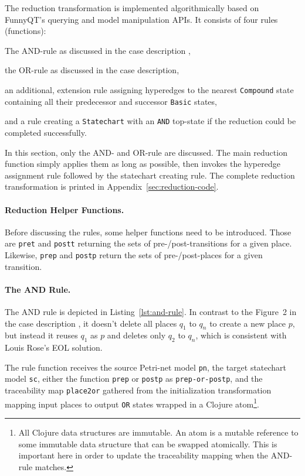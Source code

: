\documentclass[submission]{eptcs}
\begin{document}
The reduction transformation is implemented algorithmically based on FunnyQT's
querying and model manipulation APIs.  It consists of four rules (functions):
\begin{compactenum}
\item The AND-rule as discussed in the case description \cite{pn2sccasedesc},
\item the OR-rule as discussed in the case description,
\item an additional, extension rule assigning hyperedges to the nearest
  \verb|Compound| state containing all their predecessor and successor
  \verb|Basic| states,
\item and a rule creating a \verb|Statechart| with an \verb|AND| top-state if
  the reduction could be completed successfully.
\end{compactenum}

In this section, only the AND- and OR-rule are discussed.  The main reduction
function simply applies them as long as possible, then invokes the hyperedge
assignment rule followed by the statechart creating rule.  The complete
reduction transformation is printed in Appendix~\ref{sec:reduction-code}.

\paragraph{Reduction Helper Functions.}
\label{sec:reduct-help-functions}

Before discussing the rules, some helper functions need to be introduced.
Those are \verb|pret| and \verb|postt| returning the sets of
pre-/post-transitions for a given place.  Likewise, \verb|prep| and
\verb|postp| return the sets of pre-/post-places for a given transition.

\paragraph{The AND Rule.}
\label{sec:and-rule}

The AND rule is depicted in Listing~\ref{lst:and-rule}.  In contrast to the
Figure~2 in the case description \cite{pn2sccasedesc}, it doesn't delete all
places $q_1$ to $q_n$ to create a new place $p$, but instead it reuses $q_1$ as
$p$ and deletes only $q_2$ to $q_n$, which is consistent with Louis Rose's EOL
solution.

The rule function receives the source Petri-net model \verb|pn|, the target
statechart model \verb|sc|, either the function \verb|prep| or \verb|postp| as
\verb|prep-or-postp|, and the traceability map \verb|place2or| gathered from
the initialization transformation mapping input places to output \verb|OR|
states wrapped in a Clojure atom\footnote{All Clojure data structures are
  immutable.  An atom is a mutable reference to some immutable data structure
  that can be swapped atomically.  This is important here in order to update
  the traceability mapping when the AND-rule matches.}.
\end{document}
